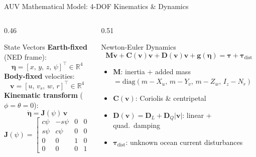 \documentclass[aspectratio=169,10pt]{beamer}
\begin{document}
\begin{frame}{AUV Mathematical Model: 4-DOF Kinematics \& Dynamics}

\begin{columns}[T]
\begin{column}{0.46\textwidth}
  \begin{block}{State Vectors}
    \textbf{Earth-fixed} (NED frame):
    \[
      \bm{\eta} = [x,\, y,\, z,\, \psi]^\top \in \mathbb{R}^4
    \]
    \textbf{Body-fixed} velocities:
    \[
      \mathbf{v} = [u,\, v_s,\, w,\, r]^\top \in \mathbb{R}^4
    \]
    \textbf{Kinematic transform} ($\phi{=}\theta{=}0$):
    \[
      \dot{\bm{\eta}} = \mathbf{J}(\psi)\,\mathbf{v}
    \]
    \[
      \mathbf{J}(\psi)=\begin{bmatrix}c\psi & -s\psi & 0 & 0\\ s\psi & c\psi & 0 & 0\\ 0 & 0 & 1 & 0\\ 0 & 0 & 0 & 1\end{bmatrix}
    \]
  \end{block}
\end{column}
\begin{column}{0.51\textwidth}
  \begin{block}{Newton-Euler Dynamics}
    \[
      \mathbf{M}\dot{\mathbf{v}}
      + \mathbf{C}(\mathbf{v})\mathbf{v}
      + \mathbf{D}(\mathbf{v})\mathbf{v}
      + \mathbf{g}(\bm{\eta})
      = \bm{\tau} + \bm{\tau}_\text{dist}
    \]
    \vspace{-4pt}
    \begin{itemize}\small
      \item $\mathbf{M}$: inertia + added mass
            $= \text{diag}(m{-}X_{\dot{u}},\, m{-}Y_{\dot{v}},\, m{-}Z_{\dot{w}},\, I_z{-}N_{\dot{r}})$
      \item $\mathbf{C}(\mathbf{v})$: Coriolis \& centripetal
      \item $\mathbf{D}(\mathbf{v}) = \mathbf{D}_L + \mathbf{D}_Q|\mathbf{v}|$: linear + quad.\ damping
      \item $\bm{\tau}_\text{dist}$: unknown ocean current disturbances
    \end{itemize}
  \end{block}
  \vspace{4pt}
\end{column}
\end{columns}
\end{frame}
\end{document}
